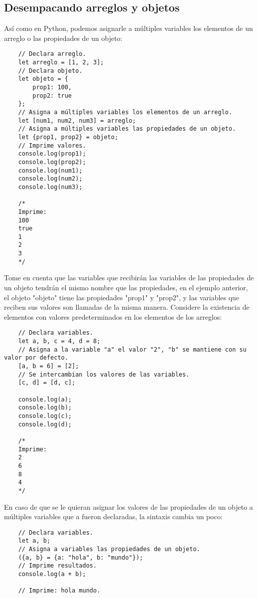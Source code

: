 \subsection{Desempacando arreglos y objetos}

Así como en Python, podemos asignarle a múltiples variables los elementos de un arreglo o las propiedades de un objeto:
\begin{lstlisting}
    // Declara arreglo.
    let arreglo = [1, 2, 3];
    // Declara objeto.
    let objeto = {
        prop1: 100,
        prop2: true
    };
    // Asigna a múltiples variables los elementos de un arreglo.
    let [num1, num2, num3] = arreglo;
    // Asigna a múltiples variables las propiedades de un objeto.
    let {prop1, prop2} = objeto;
    // Imprime valores.
    console.log(prop1);
    console.log(prop2);
    console.log(num1);
    console.log(num2);
    console.log(num3);

    /*
    Imprime:
    100
    true
    1
    2
    3
    */
\end{lstlisting}

Tome en cuenta que las variables que recibirán las variables de las propiedades de un objeto tendrán el mismo nombre que las propiedades, en el ejemplo anterior, el objeto "objeto" tiene las propiedades "prop1" y "prop2", y las variables que reciben sus valores son llamadas de la misma manera. Considere la existencia de elementos con valores predeterminados en los elementos de los arreglos:
\begin{lstlisting}
    // Declara variables.
    let a, b, c = 4, d = 8;
    // Asigna a la variable "a" el valor "2", "b" se mantiene con su valor por defecto.
    [a, b = 6] = [2];
    // Se intercambian los valores de las variables.
    [c, d] = [d, c];

    console.log(a);
    console.log(b);
    console.log(c);
    console.log(d);

    /*
    Imprime:
    2
    6
    8
    4
    */
\end{lstlisting}

En caso de que se le quieran asignar los valores de las propiedades de un objeto a múltiples variables que a fueron declaradas, la sintaxis cambia un poco:
\begin{lstlisting}
    // Declara variables.
    let a, b;
    // Asigna a variables las propiedades de un objeto.
    ({a, b} = {a: "hola", b: "mundo"});
    // Imprime resultados.
    console.log(a + b);

    // Imprime: hola mundo.
\end{lstlisting}

